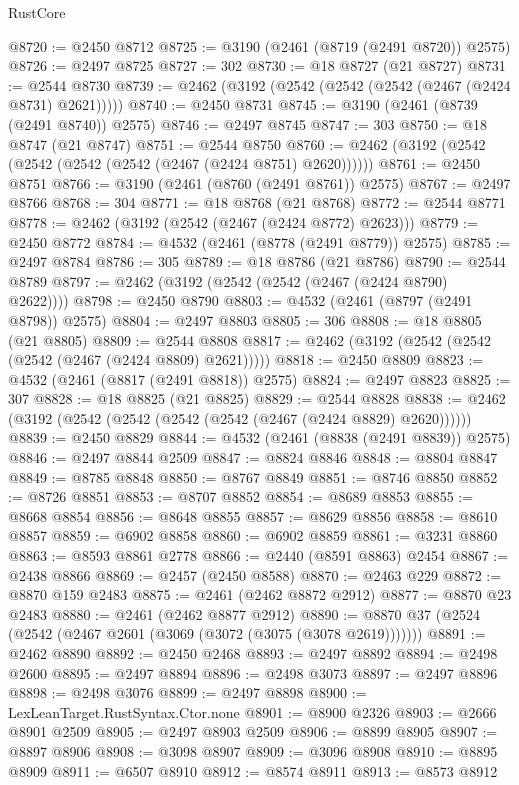 \begin{lexlean}{RustCore}
\begin{coremodule}
@8720 := @2450 @8712
@8725 := @3190 (@2461 (@8719 (@2491 @8720)) @2575)
@8726 := @2497 @8725
@8727 := 302
@8730 := @18 @8727 (@21 @8727)
@8731 := @2544 @8730
@8739 := @2462 (@3192 (@2542 (@2542 (@2542 (@2467 (@2424 @8731) @2621)))))
@8740 := @2450 @8731
@8745 := @3190 (@2461 (@8739 (@2491 @8740)) @2575)
@8746 := @2497 @8745
@8747 := 303
@8750 := @18 @8747 (@21 @8747)
@8751 := @2544 @8750
@8760 := @2462 (@3192 (@2542 (@2542 (@2542 (@2542 (@2467 (@2424 @8751) @2620))))))
@8761 := @2450 @8751
@8766 := @3190 (@2461 (@8760 (@2491 @8761)) @2575)
@8767 := @2497 @8766
@8768 := 304
@8771 := @18 @8768 (@21 @8768)
@8772 := @2544 @8771
@8778 := @2462 (@3192 (@2542 (@2467 (@2424 @8772) @2623)))
@8779 := @2450 @8772
@8784 := @4532 (@2461 (@8778 (@2491 @8779)) @2575)
@8785 := @2497 @8784
@8786 := 305
@8789 := @18 @8786 (@21 @8786)
@8790 := @2544 @8789
@8797 := @2462 (@3192 (@2542 (@2542 (@2467 (@2424 @8790) @2622))))
@8798 := @2450 @8790
@8803 := @4532 (@2461 (@8797 (@2491 @8798)) @2575)
@8804 := @2497 @8803
@8805 := 306
@8808 := @18 @8805 (@21 @8805)
@8809 := @2544 @8808
@8817 := @2462 (@3192 (@2542 (@2542 (@2542 (@2467 (@2424 @8809) @2621)))))
@8818 := @2450 @8809
@8823 := @4532 (@2461 (@8817 (@2491 @8818)) @2575)
@8824 := @2497 @8823
@8825 := 307
@8828 := @18 @8825 (@21 @8825)
@8829 := @2544 @8828
@8838 := @2462 (@3192 (@2542 (@2542 (@2542 (@2542 (@2467 (@2424 @8829) @2620))))))
@8839 := @2450 @8829
@8844 := @4532 (@2461 (@8838 (@2491 @8839)) @2575)
@8846 := @2497 @8844 @2509
@8847 := @8824 @8846
@8848 := @8804 @8847
@8849 := @8785 @8848
@8850 := @8767 @8849
@8851 := @8746 @8850
@8852 := @8726 @8851
@8853 := @8707 @8852
@8854 := @8689 @8853
@8855 := @8668 @8854
@8856 := @8648 @8855
@8857 := @8629 @8856
@8858 := @8610 @8857
@8859 := @6902 @8858
@8860 := @6902 @8859
@8861 := @3231 @8860
@8863 := @8593 @8861 @2778
@8866 := @2440 (@8591 @8863) @2454
@8867 := @2438 @8866
@8869 := @2457 (@2450 @8588)
@8870 := @2463 @229
@8872 := @8870 @159 @2483
@8875 := @2461 (@2462 @8872 @2912)
@8877 := @8870 @23 @2483
@8880 := @2461 (@2462 @8877 @2912)
@8890 := @8870 @37 (@2524 (@2542 (@2467 @2601 (@3069 (@3072 (@3075 (@3078 @2619)))))))
@8891 := @2462 @8890
@8892 := @2450 @2468
@8893 := @2497 @8892
@8894 := @2498 @2600
@8895 := @2497 @8894
@8896 := @2498 @3073
@8897 := @2497 @8896
@8898 := @2498 @3076
@8899 := @2497 @8898
@8900 := LexLeanTarget.RustSyntax.Ctor.none
@8901 := @8900 @2326
@8903 := @2666 @8901 @2509
@8905 := @2497 @8903 @2509
@8906 := @8899 @8905
@8907 := @8897 @8906
@8908 := @3098 @8907
@8909 := @3096 @8908
@8910 := @8895 @8909
@8911 := @6507 @8910
@8912 := @8574 @8911
@8913 := @8573 @8912

\end{coremodule}
\end{lexlean}
